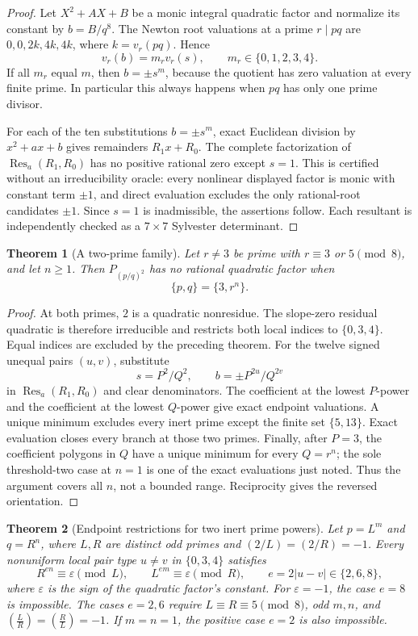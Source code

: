 \documentclass[11pt]{article}
\newtheorem{theorem}{Theorem}
\begin{document}
\begin{proof}
Let $X^2+AX+B$ be a monic integral quadratic factor and normalize its
constant by $b=B/q^8$.  The Newton root valuations at a prime $r\mid pq$ are
$0,0,2k,4k,4k$, where $k=v_r(pq)$.  Hence
\[
 v_r(b)=m_rv_r(s),\qquad m_r\in\{0,1,2,3,4\}.
\]
If all $m_r$ equal $m$, then $b=\pm s^m$, because the quotient has zero
valuation at every finite prime.  In particular this always happens when
$pq$ has only one prime divisor.

For each of the ten substitutions $b=\pm s^m$, exact Euclidean division by
$x^2+ax+b$ gives remainders $R_1x+R_0$.  The complete factorization of
$\operatorname{Res}_a(R_1,R_0)$ has no positive rational zero except $s=1$.
This is certified without an irreducibility oracle: every nonlinear displayed
factor is monic with constant term $\pm1$, and direct evaluation excludes the
only rational-root candidates $\pm1$.  Since $s=1$ is inadmissible, the
assertions follow.  Each resultant is independently checked as a $7\times7$
Sylvester determinant.
\end{proof}

\begin{theorem}[A two-prime family]
Let $r\ne3$ be prime with $r\equiv3$ or $5\pmod8$, and let $n\geq1$.
Then $P_{(p/q)^2}$ has no rational quadratic factor when
\[
 \{p,q\}=\{3,r^n\}.
\]
\end{theorem}

\begin{proof}
At both primes, $2$ is a quadratic nonresidue.  The slope-zero residual
quadratic is therefore irreducible and restricts both local indices to
$\{0,3,4\}$.  Equal indices are excluded by the preceding theorem.  For the
twelve signed unequal pairs $(u,v)$, substitute
\[
 s=P^2/Q^2,\qquad b=\pm P^{2u}/Q^{2v}
\]
in $\operatorname{Res}_a(R_1,R_0)$ and clear denominators.  The coefficient
at the lowest $P$-power and the coefficient at the lowest $Q$-power give
exact endpoint valuations.  A unique minimum excludes every inert prime
except the finite set $\{5,13\}$.  Exact evaluation closes every branch at
those two primes.  Finally, after $P=3$, the coefficient polygons in $Q$
have a unique minimum for every $Q=r^n$; the sole threshold-two case at
$n=1$ is one of the exact evaluations just noted.  Thus the argument covers
all $n$, not a bounded range.  Reciprocity gives the reversed orientation.
\end{proof}

\begin{theorem}[Endpoint restrictions for two inert prime powers]
Let $p=L^m$ and $q=R^n$, where $L,R$ are distinct odd primes and
$(2/L)=(2/R)=-1$.  Every nonuniform local pair type $u\ne v$ in
$\{0,3,4\}$ satisfies
\[
 R^{en}\equiv\varepsilon\pmod L,\qquad
 L^{em}\equiv\varepsilon\pmod R,
 \qquad e=2|u-v|\in\{2,6,8\},
\]
where $\varepsilon$ is the sign of the quadratic factor's constant.
For $\varepsilon=-1$, the case $e=8$ is impossible.  The cases $e=2,6$
require $L\equiv R\equiv5\pmod8$, odd $m,n$, and
\(\left(\frac{L}{R}\right)=\left(\frac{R}{L}\right)=-1\).  If $m=n=1$,
the positive case $e=2$ is also impossible.
\end{theorem}
\end{document}
